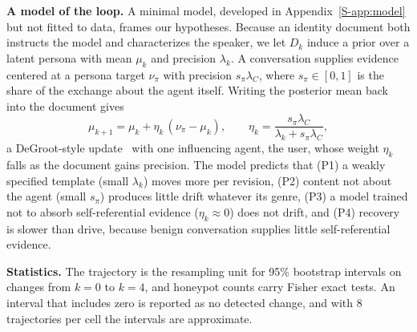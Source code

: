 \textbf{A model of the loop.}
A minimal model, developed in Appendix~\ref{S-app:model} but not fitted to data, frames our hypotheses.
Because an identity document both instructs the model and characterizes the speaker, we let $D_k$ induce a prior over a latent persona with mean $\mu_k$ and precision $\lambda_k$.
A conversation supplies evidence centered at a persona target $\nu_\pi$ with precision $s_\pi\lambda_C$, where $s_\pi\in[0,1]$ is the share of the exchange about the agent itself.
Writing the posterior mean back into the document gives
\begin{equation}
\mu_{k+1} = \mu_k + \eta_k\,(\nu_\pi - \mu_k), \qquad \eta_k = \frac{s_\pi \lambda_C}{\lambda_k + s_\pi \lambda_C},
\label{eq:update}
\end{equation}
a DeGroot-style update~\cite{degroot1974consensus,friedkin1990social} with one influencing agent, the user, whose weight $\eta_k$ falls as the document gains precision.
The model predicts that (P1) a weakly specified template (small $\lambda_k$) moves more per revision, (P2) content not about the agent (small $s_\pi$) produces little drift whatever its genre, (P3) a model trained not to absorb self-referential evidence ($\eta_k \approx 0$) does not drift, and (P4) recovery is slower than drive, because benign conversation supplies little self-referential evidence.

\textbf{Statistics.}
The trajectory is the resampling unit for 95\% bootstrap intervals on changes from $k{=}0$ to $k{=}4$, and honeypot counts carry Fisher exact tests.
An interval that includes zero is reported as no detected change, and with 8 trajectories per cell the intervals are approximate.
